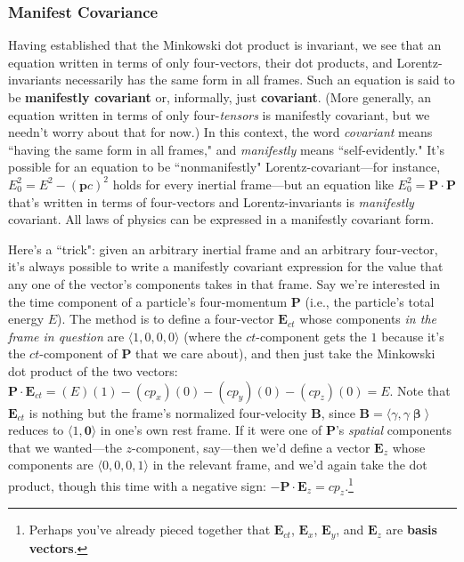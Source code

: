 \documentclass[12pt]{article}
\renewcommand{\vv}[1]{\mathbf{#1}}
\newcommand{\vvbeta}{\bm{\upbeta}}
\begin{document}
\subsubsection{Manifest Covariance}\label{sssec:mc}

Having established that the Minkowski dot product is invariant, we see that an equation written in terms of only four-vectors, their dot products, and Lorentz-invariants necessarily has the same form in all frames. Such an equation is said to be \textbf{manifestly covariant} or, informally, just \textbf{covariant}. (More generally, an equation written in terms of only four-\emph{tensors} is manifestly covariant, but we needn't worry about that for now.) In this context, the word \emph{covariant} means ``having the same form in all frames," and \emph{manifestly} means ``self-evidently." It's possible for an equation to be ``nonmanifestly" Lorentz-covariant---for instance, $E_0^2 = E^2 - (\vv p c)^2$ holds for every inertial frame---but an equation like ${E_0^2 = \vv P \cdot \vv P}$ that's written in terms of four-vectors and Lorentz-invariants is \emph{manifestly} covariant. All laws of physics can be expressed in a manifestly covariant form.

Here's a ``trick": given an arbitrary inertial frame and an arbitrary four-vector, it's always possible to write a manifestly covariant expression for the value that any one of the vector's components takes in that frame. Say we're interested in the time component of a particle's four-momentum $\vv P$ (i.e., the particle's total energy $E$). The method is to define a four-vector $\vv E _{ct}$ whose components \emph{in the frame in question} are $\langle 1, 0, 0, 0 \rangle$ (where the $ct$-component gets the $1$ because it's the $ct$-component of $\vv P$ that we care about), and then just take the Minkowski dot product of the two vectors: ${\vv P \cdot \vv E_{ct} = (E)(1) - (cp_x)(0) - (cp_y)(0) - (cp_z)(0) = E}$. Note that $\vv E_{ct}$ is nothing but the frame's normalized four-velocity $\vv B$, since $\vv B = \langle \gamma, \gamma \vvbeta \rangle$ reduces to $\langle 1, \vv 0 \rangle$ in one's own rest frame. If it were one of $\vv P$'s \emph{spatial} components that we wanted---the $z$-component, say---then we'd define a vector $\vv E_z$ whose components are $\langle 0, 0, 0, 1 \rangle$ in the relevant frame, and we'd again take the dot product, though this time with a negative sign: $- \vv P \cdot \vv E_z = c p_z$.\footnote{Perhaps you've already pieced together that $\vv E_{ct}$, $\vv E_{x}$, $\vv E_{y}$, and $\vv E_z$ are \textbf{basis vectors}.}
\end{document}
